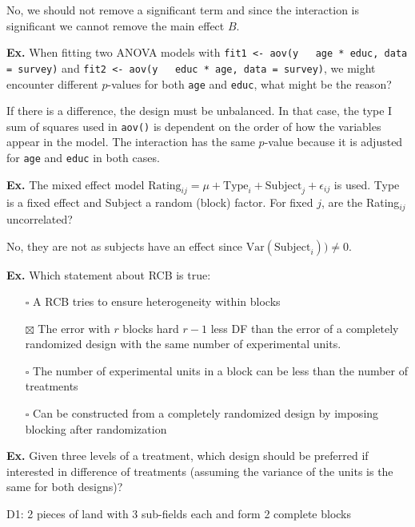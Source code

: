 No, we should not remove a significant term and since the interaction is significant we cannot remove the main effect $B$.


\hrulefill

\textbf{Ex.} When fitting two ANOVA models with \texttt{fit1 <- aov(y ~ age * educ, data = survey)} and \texttt{fit2 <- aov(y ~ educ * age, data = survey)}, we might encounter different $p$-values for both \texttt{age} and \texttt{educ}, what might be the reason? \medskip

If there is a difference, the design must be unbalanced. In that case, the type I sum of squares used in \texttt{aov()} is dependent on the order of how the variables appear in the model. The interaction has the same $p$-value because it is adjusted for \texttt{age} and \texttt{educ} in both cases.


\hrulefill

\textbf{Ex.} The mixed effect model $\text{Rating}_{ij} = \mu + \text{Type}_i + \text{Subject}_j + \epsilon_{ij}$ is used. Type is a fixed effect and Subject a random (block) factor. For fixed $j$, are the Rating$_{ij}$ uncorrelated? \medskip

No, they are not as subjects have an effect since $\text{Var}(\text{Subject}_i)) \neq 0$.


\hrulefill

\textbf{Ex.} Which statement about RCB is true:
\begin{itemize}
	\item[$\square$]  A RCB tries to ensure heterogeneity within blocks
	\item[$\boxtimes$] The error with $r$ blocks hard $r-1$ less DF than the error of a completely randomized design with the same number of experimental units.
	\item[$\square$] The number of experimental units in a block can be less than the number of treatments
	\item[$\square$] Can be constructed from a completely randomized design by imposing blocking after randomization
\end{itemize}


\hrulefill

\textbf{Ex.} Given three levels of a treatment, which design should be preferred if interested in difference of treatments (assuming the variance of the units is the same for both designs)?\smallskip

D1: 2 pieces of land with 3 sub-fields each and form 2 complete blocks\smallskip

